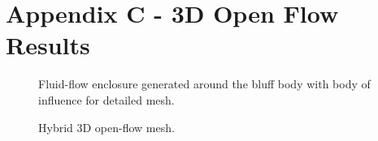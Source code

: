\newpage
\section*{Appendix C - 3D Open Flow Results} 

\begin{figure}[!htb]
    \centering
    \noindent{}
    \caption{Fluid-flow enclosure generated around the bluff body with body of influence for detailed mesh.}
    \label{fig:3D_OF_FLOWFIELD}
\end{figure}

\begin{figure}[!htb]
    \centering
    \noindent{}
    \caption{Hybrid 3D open-flow mesh.}
    \label{fig:3D_OF_MESH}
\end{figure}

